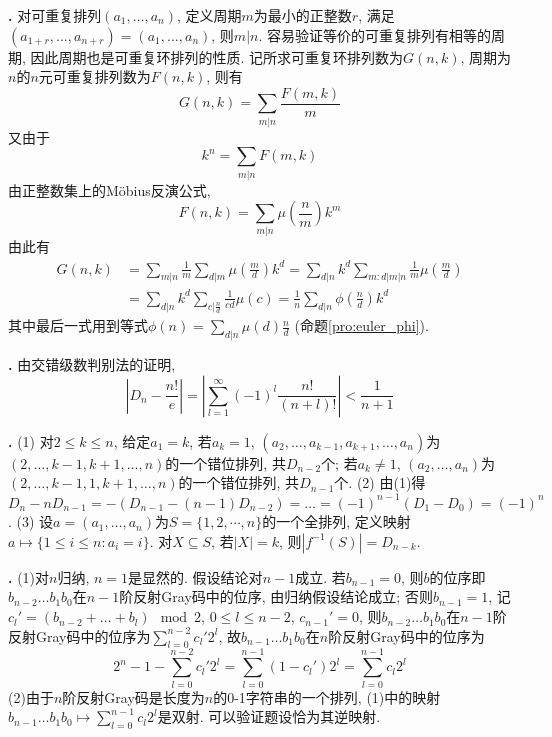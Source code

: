 \par \textbf{\thesolenum .} \cite{IC} 对可重复排列$(a_1,\dots,a_n)$, 定义周期$m$为最小的正整数$r$, 满足$(a_{1+r},\dots,a_{n+r})=(a_{1},\dots,a_{n})$, 则$m|n$. 容易验证等价的可重复排列有相等的周期, 因此周期也是可重复环排列的性质. 记所求可重复环排列数为$G(n,k)$, 周期为$n$的$n$元可重复排列数为$F(n,k)$, 则有
\begin{equation}
    G(n,k)=\sum_{m|n} \frac{F(m,k)}{m}
\end{equation}
又由于
\begin{equation}
    k^n = \sum_{m|n} F(m,k)
\end{equation}
由正整数集上的Möbius反演公式,
\begin{equation}
    F(n,k) = \sum_{m|n} \mu\left(\frac{n}{m}\right) k^m
\end{equation}
由此有
\begin{align*}
    G(n,k) &= \sum_{m|n} \frac{1}{m} \sum_{d|m} \mu\left(\frac{m}{d}\right) k^d=\sum_{d|n} k^d \sum_{m:d|m|n} \frac{1}{m} \mu\left(\frac{m}{d}\right)\\
    &=\sum_{d|n} k^d \sum_{c|\frac{n}{d}} \frac{1}{cd} \mu(c) =\frac{1}{n}\sum_{d|n} \phi\left(\frac{n}{d}\right)k^d
\end{align*}
其中最后一式用到等式$\phi(n)=\sum_{d|n}\mu(d)\frac{n}{d}$ (命题\ref{pro:euler_phi}). 


\par \textbf{\thesolenum .} \cite{IC} 由交错级数判别法的证明, 
\begin{equation}
    \left|D_n - \frac{n!}{e}\right|=\left|  \sum_{l=1}^\infty (-1)^{l} \frac{n!}{(n+l)!}\right| < \frac{1}{n+1} 
\end{equation}

\par \textbf{\thesolenum .} (1) \cite{IC} 对$2\le k\le n$, 给定$a_1=k$, 若$a_k=1$, $(a_2,\dots,a_{k-1},a_{k+1}, \dots, a_n)$为$(2,\dots,k-1,k+1,\dots, n)$的一个错位排列, 共$D_{n-2}$个; 若$a_k\neq 1$, $(a_2,\dots,a_n)$为$(2,\dots,k-1,1,k+1,\dots, n)$的一个错位排列, 共$D_{n-1}$个. (2) \cite{IC} 由(1)得$D_n-nD_{n-1}=-(D_{n-1}-(n-1)D_{n-2})=\dots=(-1)^{n-1}(D_1-D_0)=(-1)^n$. (3) 设$a=(a_1,\dots,a_n)$为$S=\{1,2,\cdots,n\}$的一个全排列, 定义映射$a\mapsto \{1\le i\le n: a_i=i\}$. 对$X\subseteq S$, 若$|X|=k$, 则$|f^{-1}(S)|=D_{n-k}$. 

\par \textbf{\thesolenum .} (1)对$n$归纳, $n=1$是显然的. 假设结论对$n-1$成立. 若$b_{n-1}=0$, 则$b$的位序即$b_{n-2}\dots b_1b_0$在$n-1$阶反射Gray码中的位序, 由归纳假设结论成立; 否则$b_{n-1}=1$, 记$c_l'=(b_{n-2}+\dots+b_l) \mod 2$, $0\le l\le n-2$, $c_{n-1}'=0$, 则$b_{n-2}\dots b_1b_0$在$n-1$阶反射Gray码中的位序为$\sum_{l=0}^{n-2} c_l' 2^l$, 故$b_{n-1}\dots b_1b_0$在$n$阶反射Gray码中的位序为
\begin{equation}
    2^n - 1 - \sum_{l=0}^{n-2} c_l' 2^l = \sum_{l=0}^{n-1} (1-c_l') 2^l = \sum_{l=0}^{n-1} c_l 2^l
\end{equation} 
(2)由于$n$阶反射Gray码是长度为$n$的0-1字符串的一个排列, (1)中的映射$b_{n-1}\dots b_1b_0\mapsto \sum_{l=0}^{n-1} c_l 2^l$是双射. 可以验证题设恰为其逆映射. 

